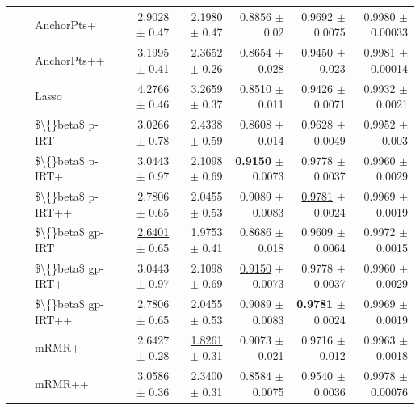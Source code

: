 \begin{longtable}{llp{}rrrrr}
 &  & AnchorPts+ & 2.9028 {\scriptsize $\pm$ 0.47} & 2.1980 {\scriptsize $\pm$ 0.47} & 0.8856 {\scriptsize $\pm$ 0.02} & 0.9692 {\scriptsize $\pm$ 0.0075} & 0.9980 {\scriptsize $\pm$ 0.00033} \\
 &  & AnchorPts++ & 3.1995 {\scriptsize $\pm$ 0.41} & 2.3652 {\scriptsize $\pm$ 0.26} & 0.8654 {\scriptsize $\pm$ 0.028} & 0.9450 {\scriptsize $\pm$ 0.023} & 0.9981 {\scriptsize $\pm$ 0.00014} \\
 &  & Lasso & 4.2766 {\scriptsize $\pm$ 0.46} & 3.2659 {\scriptsize $\pm$ 0.37} & 0.8510 {\scriptsize $\pm$ 0.011} & 0.9426 {\scriptsize $\pm$ 0.0071} & 0.9932 {\scriptsize $\pm$ 0.0021} \\
 &  & \$\textbackslash\{\}beta\$ p-IRT & 3.0266 {\scriptsize $\pm$ 0.78} & 2.4338 {\scriptsize $\pm$ 0.59} & 0.8608 {\scriptsize $\pm$ 0.014} & 0.9628 {\scriptsize $\pm$ 0.0049} & 0.9952 {\scriptsize $\pm$ 0.003} \\
 &  & \$\textbackslash\{\}beta\$ p-IRT+ & 3.0443 {\scriptsize $\pm$ 0.97} & 2.1098 {\scriptsize $\pm$ 0.69} & \textbf{0.9150} {\scriptsize $\pm$ 0.0073} & 0.9778 {\scriptsize $\pm$ 0.0037} & 0.9960 {\scriptsize $\pm$ 0.0029} \\
 &  & \$\textbackslash\{\}beta\$ p-IRT++ & 2.7806 {\scriptsize $\pm$ 0.65} & 2.0455 {\scriptsize $\pm$ 0.53} & 0.9089 {\scriptsize $\pm$ 0.0083} & \underline{0.9781} {\scriptsize $\pm$ 0.0024} & 0.9969 {\scriptsize $\pm$ 0.0019} \\
 &  & \$\textbackslash\{\}beta\$ gp-IRT & \underline{2.6401} {\scriptsize $\pm$ 0.65} & 1.9753 {\scriptsize $\pm$ 0.41} & 0.8686 {\scriptsize $\pm$ 0.018} & 0.9609 {\scriptsize $\pm$ 0.0064} & 0.9972 {\scriptsize $\pm$ 0.0015} \\
 &  & \$\textbackslash\{\}beta\$ gp-IRT+ & 3.0443 {\scriptsize $\pm$ 0.97} & 2.1098 {\scriptsize $\pm$ 0.69} & \underline{0.9150} {\scriptsize $\pm$ 0.0073} & 0.9778 {\scriptsize $\pm$ 0.0037} & 0.9960 {\scriptsize $\pm$ 0.0029} \\
 &  & \$\textbackslash\{\}beta\$ gp-IRT++ & 2.7806 {\scriptsize $\pm$ 0.65} & 2.0455 {\scriptsize $\pm$ 0.53} & 0.9089 {\scriptsize $\pm$ 0.0083} & \textbf{0.9781} {\scriptsize $\pm$ 0.0024} & 0.9969 {\scriptsize $\pm$ 0.0019} \\
 &  & mRMR+ & 2.6427 {\scriptsize $\pm$ 0.28} & \underline{1.8261} {\scriptsize $\pm$ 0.31} & 0.9073 {\scriptsize $\pm$ 0.021} & 0.9716 {\scriptsize $\pm$ 0.012} & 0.9963 {\scriptsize $\pm$ 0.0018} \\
 &  & mRMR++ & 3.0586 {\scriptsize $\pm$ 0.36} & 2.3400 {\scriptsize $\pm$ 0.31} & 0.8584 {\scriptsize $\pm$ 0.0075} & 0.9540 {\scriptsize $\pm$ 0.0036} & 0.9978 {\scriptsize $\pm$ 0.00076} \\

\end{longtable}
